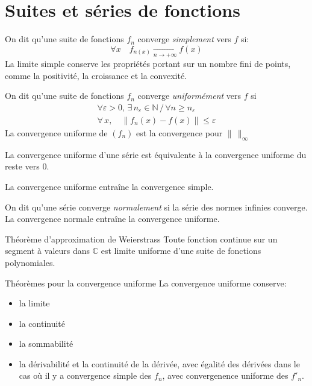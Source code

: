 \documentclass[french, a4paper, 10pt, twocolumn]{article}
\newcommand{\N}{\mathbb{N}}   %
\newcommand{\C}{\mathbb{C}}   %
\begin{document}
\section{Suites et séries de fonctions}
\begin{definition}
  On dit qu'une suite de fonctions \(f_{n}\) converge \emph{simplement} vers \(f\) si:
  \[\forall x\quad f_{n(x)}\xrightarrow[n\rightarrow +\infty]{} f(x)\]
  La limite simple conserve les propriétés portant sur un nombre fini de points, comme la positivité, la croissance et la convexité.
\end{definition}

\begin{definition}
  On dit qu'une suite de fonctions \(f_{n}\) converge \emph{uniformément} vers \(f\) si
  \begin{align*}
    \forall \varepsilon >0,\,\exists\, n_{\varepsilon}\in\N \,\slash\, \forall n\geqslant n_{\varepsilon} \\
    \forall\, x,\quad \left\lVert f_{n}(x)-f(x)\right\rVert \leqslant \varepsilon
  \end{align*}
  La convergence uniforme de \((f_{n})\) est la convergence pour \(\lVert\,\rVert_{\infty}\)

  La convergence uniforme d'une série est équivalente à la convergence uniforme du reste vers \(0\).

  La convergence uniforme entraîne la convergence simple.
\end{definition}

\begin{definition}
  On dit qu'une série converge \emph{normalement} si la série des normes infinies converge.
  La convergence normale entraîne la convergence uniforme.
\end{definition}

\begin{theoreme}{Théorème d'approximation de Weierstrass}
  Toute fonction continue sur un segment à valeurs dans \(\C\) est limite uniforme d'une suite de fonctions polynomiales.
\end{theoreme}

\begin{theoreme}{Théorèmes pour la convergence uniforme}
  La convergence uniforme conserve:
  \begin{itemize}[label=\(\bullet\)]
    \item la limite
    \item la continuité
    \item la sommabilité
    \item la dérivabilité et la continuité de la dérivée, avec égalité des dérivées dans le cas où il y a convergence simple des $f_{n}$, avec convergenence uniforme des $f'_{n}$.
  \end{itemize}
\end{theoreme}
\end{document}
